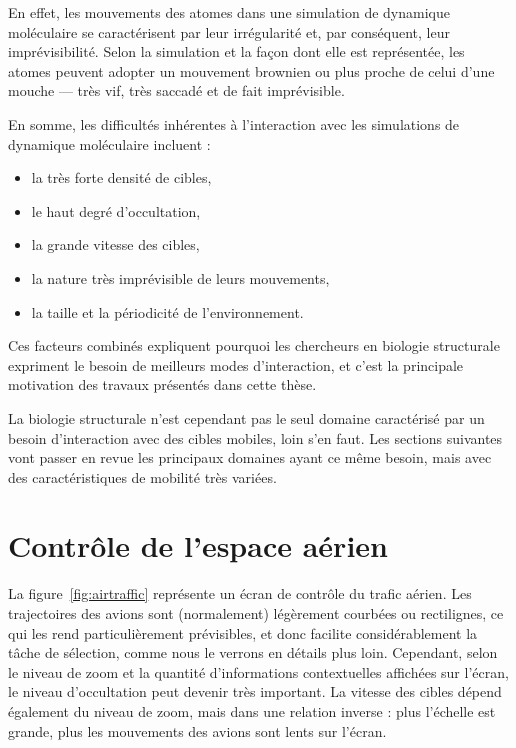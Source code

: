 	En effet, les mouvements des atomes dans une simulation de dynamique moléculaire se caractérisent par leur irrégularité et, par conséquent, leur imprévisibilité. Selon la simulation et la façon dont elle est représentée, les atomes peuvent adopter un mouvement brownien ou plus proche de celui d'une mouche --- très vif, très saccadé et de fait imprévisible.
	
	En somme, les difficultés inhérentes à l'interaction avec les simulations de dynamique moléculaire incluent :
	
	\begin{itemize}
		\item la très forte densité de cibles,
		\item le haut degré d'occultation,
		\item la grande vitesse des cibles,
		\item la nature très imprévisible de leurs mouvements,
		\item la taille et la périodicité de l'environnement.
	\end{itemize}
	
	Ces facteurs combinés expliquent pourquoi les chercheurs en biologie structurale expriment le besoin de meilleurs modes d'interaction, et c'est la principale motivation des travaux présentés dans cette thèse.
	
	La biologie structurale n'est cependant pas le seul domaine caractérisé par un besoin d'interaction avec des cibles mobiles, loin s'en faut. Les sections suivantes vont passer en revue les principaux domaines ayant ce même besoin, mais avec des caractéristiques de mobilité très variées.
	
	
	\section{Contrôle de l'espace aérien}
 La figure~\ref{fig:airtraffic} représente un écran de contrôle du trafic aérien. Les trajectoires des avions sont (normalement) légèrement courbées ou rectilignes, ce qui les rend particulièrement prévisibles, et donc facilite considérablement la tâche de sélection, comme nous le verrons en détails plus loin. Cependant, selon le niveau de zoom et la quantité d'informations contextuelles affichées sur l'écran, le niveau d'occultation peut devenir très important. La vitesse des cibles dépend également du niveau de zoom, mais dans une relation inverse : plus l'échelle est grande, plus les mouvements des avions sont lents sur l'écran.
	

